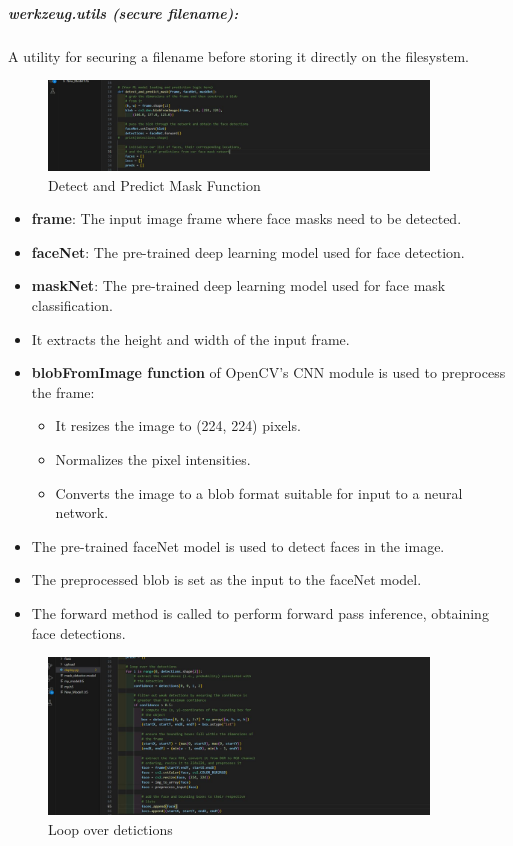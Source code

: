 \subparagraph{werkzeug.utils (secure filename):}
 A utility for securing a filename before storing it directly on the filesystem.


\begin{figure}
    \centering
    \includegraphics[width=0.90\textwidth]{Img/Chap-01/43.jpg}
    \caption{Detect and Predict Mask Function}
    \label{fig:ba_2}
\end{figure}

\begin{itemize}
    \item \textbf{frame}: The input image frame where face masks need to be detected.
    \item \textbf{faceNet}: The pre-trained deep learning model used for face detection.
    \item \textbf{maskNet}: The pre-trained deep learning model used for face mask classification.
    \item It extracts the height and width of the input frame.
    \item \textbf{blobFromImage function} of OpenCV's CNN module is used to preprocess the frame:
    \begin{itemize}
        \item It resizes the image to (224, 224) pixels.
        \item Normalizes the pixel intensities.
        \item Converts the image to a blob format suitable for input to a neural network.
    \end{itemize}
    \item The pre-trained faceNet model is used to detect faces in the image.
    \item The preprocessed blob is set as the input to the faceNet model.
    \item The forward method is called to perform forward pass inference, obtaining face detections.
\end{itemize}

\begin{figure}
    \centering
    \includegraphics[width=0.90\textwidth]{Img/Chap-01/44.jpg}
    \caption{Loop over detictions}
    \label{fig:be_3}
\end{figure}

